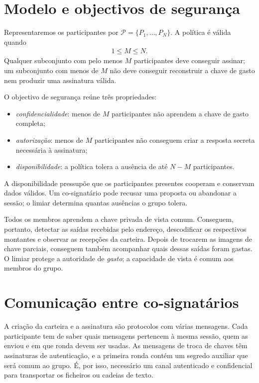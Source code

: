 \section{Modelo e objectivos de segurança}

Representaremos os participantes por
\(\mathcal P=\{P_1,\ldots,P_N\}\). A política é válida quando
\begin{align*}
 1\leq M\leq N.
\end{align*}
Qualquer subconjunto com pelo menos \(M\) participantes deve conseguir
assinar; um subconjunto com menos de \(M\) não deve conseguir reconstruir a
chave de gasto nem produzir uma assinatura válida.

O objectivo de segurança reúne três propriedades:
\begin{itemize}
 \item \emph{confidencialidade}: menos de \(M\) participantes não aprendem a
 chave de gasto completa;
 \item \emph{autorização}: menos de \(M\) participantes não conseguem criar
 a resposta secreta necessária à assinatura;
 \item \emph{disponibilidade}: a política tolera a ausência de até \(N-M\)
 participantes.
\end{itemize}
A disponibilidade pressupõe que os participantes presentes cooperam e
conservam dados válidos. Um co-signatário pode recusar uma proposta ou
abandonar a sessão; o limiar determina quantas ausências o grupo tolera.

Todos os membros aprendem a chave privada de vista comum. Conseguem, portanto,
detectar as saídas recebidas pelo endereço, descodificar os respectivos
montantes e observar as recepções da carteira. Depois de trocarem as imagens
de chave parciais, conseguem também acompanhar quais dessas saídas foram
gastas. O limiar protege a autoridade de \emph{gasto}; a capacidade de vista
é comum aos membros do grupo.

\section{Comunicação entre co-signatários}
\label{sec:communicating}

A criação da carteira e a assinatura são protocolos com várias mensagens.
Cada participante tem de saber quais mensagens pertencem à mesma sessão, quem
as enviou e em que ronda devem ser usadas. As mensagens de troca de chaves
têm assinaturas de autenticação, e a primeira ronda contém um segredo
auxiliar que será comum ao grupo. É, por isso, necessário um canal
autenticado e confidencial para transportar os ficheiros ou cadeias de texto.

